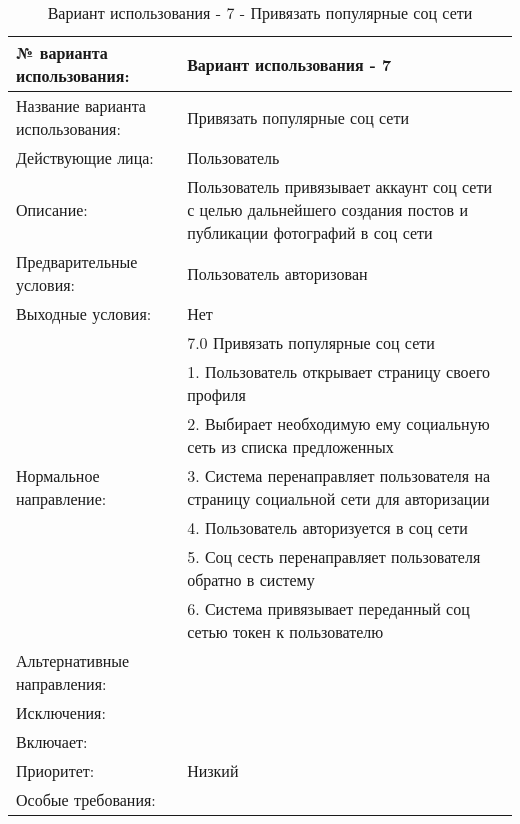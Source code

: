 \begin{table}[H]
  \caption{Вариант использования - 7 - Привязать популярные соц сети}\label{use-case-7-table}
  \begin{tabular}{|p{6cm}|p{10cm}|}
  \hline № варианта использования: & Вариант использования - 7 \\
  \hline Название варианта использования: & Привязать популярные соц сети \\
  \hline Действующие лица: & Пользователь \\
  \hline Описание: & Пользователь привязывает аккаунт соц сети с целью дальнейшего создания постов и публикации фотографий в соц сети \\
  \hline Предварительные условия: & Пользователь авторизован \\
  \hline Выходные условия: & Нет \\
  \hline \multirow{7}{*}{Нормальное направление:} & 7.0 Привязать популярные соц сети \\
  \cline{2-2} & 1. Пользователь открывает страницу своего профиля \\
  \cline{2-2} & 2. Выбирает необходимую ему социальную сеть из списка предложенных \\
  \cline{2-2} & 3. Система перенаправляет пользователя на страницу социальной сети для авторизации  \\
  \cline{2-2} & 4. Пользователь авторизуется в соц сети \\
  \cline{2-2} & 5. Соц сесть перенаправляет пользователя обратно в систему \\
  \cline{2-2} & 6. Система привязывает переданный соц сетью токен к пользователю \\
  \hline Альтернативные направления: &  \\
  \hline Исключения: &  \\
  \hline Включает: &  \\
  \hline Приоритет: & Низкий \\
  \hline Особые требования: &  \\
  \hline 
  \end{tabular}
\end{table}

